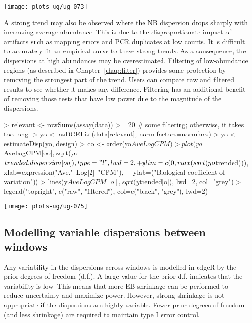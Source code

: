 \documentclass[12pt]{report}
\renewenvironment{Schunk}{\vspace{0pt}}{\vspace{0pt}}
\newcommand{\edger}{edgeR}
\begin{document}
\begin{center}
\texttt{[image: plots-ug/ug-073]}
\end{center}

A strong trend may also be observed where the NB dispersion drops sharply with increasing average abundance.
This is due to the disproportionate impact of artifacts such as mapping errors and PCR duplicates at low counts. 
It is difficult to accurately fit an empirical curve to these strong trends.  
As a consequence, the dispersions at high abundances may be overestimated. 
Filtering of low-abundance regions (as described in Chapter~\ref{chap:filter}) provides some protection by removing the strongest part of the trend.
Users can compare raw and filtered results to see whether it makes any difference.
Filtering has an additional benefit of removing those tests that have low power due to the magnitude of the dispersions.

\begin{Schunk}
\begin{Sinput}
> relevant <- rowSums(assay(data)) >= 20 # some filtering; otherwise, it takes too long.
> yo <- asDGEList(data[relevant], norm.factors=normfacs)
> yo <- estimateDisp(yo, design)
> oo <- order(yo$AveLogCPM)
> plot(yo$AveLogCPM[oo], sqrt(yo$trended.dispersion[oo]), type="l", lwd=2,
+   ylim=c(0, max(sqrt(yo$trended))), xlab=expression("Ave."~Log[2]~"CPM"), 
+   ylab=("Biological coefficient of variation"))
> lines(y$AveLogCPM[o], sqrt(y$trended[o]), lwd=2, col="grey")
> legend("topright", c("raw", "filtered"), col=c("black", "grey"), lwd=2)
\end{Sinput}
\end{Schunk}

\begin{center}
\texttt{[image: plots-ug/ug-075]}
\end{center}

\subsection{Modelling variable dispersions between windows}
Any variability in the dispersions across windows is modelled in \edger{} by the prior degrees of freedom (d.f.).
A large value for the prior d.f. indicates that the variability is low. 
This means that more EB shrinkage can be performed to reduce uncertainty and maximize power. 
However, strong shrinkage is not appropriate if the dispersions are highly variable. 
Fewer prior degrees of freedom (and less shrinkage) are required to maintain type I error control. 
\end{document}
